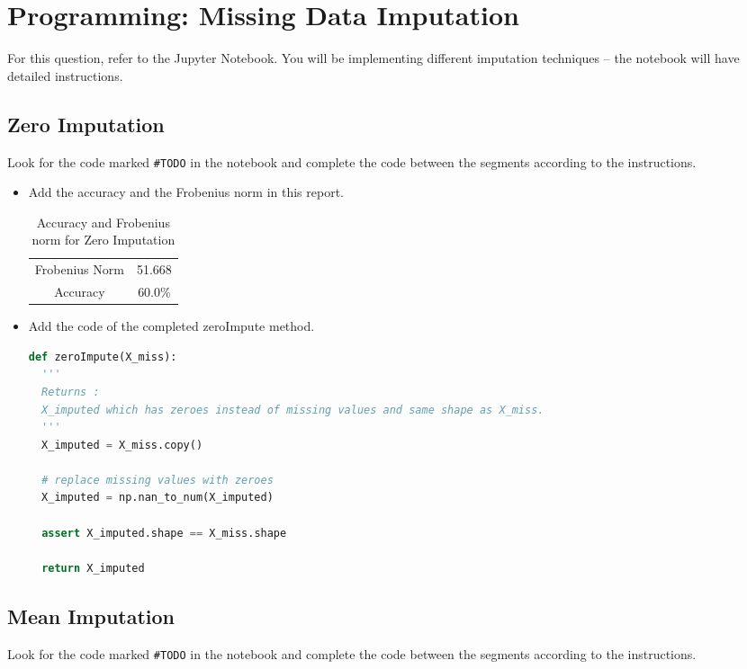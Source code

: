 \section{Programming: Missing Data Imputation}
For this question, refer to the Jupyter Notebook. You will be implementing different imputation techniques -- the notebook will have detailed instructions.

\subsection{Zero Imputation}
Look for the code marked \verb|#TODO| in the notebook and complete the code between the segments according to the instructions. \\

\begin{itemize}
    \item 
Add the accuracy and the Frobenius norm in this report.

\begin{table}[H]
\centering
\begin{tabular}{ |c|c| } 
 \hline
 Frobenius Norm & 51.668 \\
 Accuracy & 60.0\% \\
 \hline
\end{tabular}
\caption{Accuracy and Frobenius norm for Zero Imputation}
\label{nnOA}
\end{table}

\item
Add the code of the completed zeroImpute method. 
\begin{lstlisting}[language = Python, caption=zeroImpute method]
def zeroImpute(X_miss):
  '''
  Returns :
  X_imputed which has zeroes instead of missing values and same shape as X_miss.
  '''
  X_imputed = X_miss.copy()

  # replace missing values with zeroes
  X_imputed = np.nan_to_num(X_imputed)

  assert X_imputed.shape == X_miss.shape

  return X_imputed
\end{lstlisting}


\end{itemize}


\subsection{Mean Imputation}
Look for the code marked \verb|#TODO| in the notebook and complete the code between the segments according to the instructions. \\

